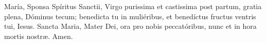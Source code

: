 María, Sponsa Spíritus Sanctii, Virgo purissima et castissima post partum, gratia plena, Dóminus tecum; benedicta tu in muliéribus, 
et benedíctus fructus ventris tui, Iesus. Sancta Maria, Mater Dei, ora pro nobis peccatóribus, nunc et in hora mortis nostr{\ae}. Amen.